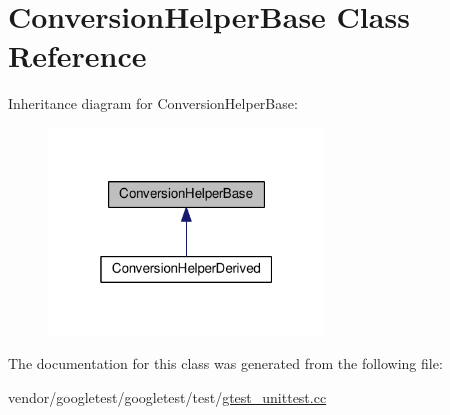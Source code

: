 \hypertarget{classConversionHelperBase}{}\section{Conversion\+Helper\+Base Class Reference}
\label{classConversionHelperBase}


Inheritance diagram for Conversion\+Helper\+Base\+:
\nopagebreak
\begin{figure}[H]
\begin{center}
\leavevmode
\includegraphics[width=208pt]{classConversionHelperBase__inherit__graph}
\end{center}
\end{figure}


The documentation for this class was generated from the following file\+:\begin{DoxyCompactItemize}
\item 
vendor/googletest/googletest/test/\hyperlink{gtest__unittest_8cc}{gtest\+\_\+unittest.\+cc}\end{DoxyCompactItemize}
